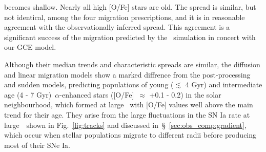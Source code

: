 \documentclass[draft2.tex]{subfiles}
\begin{document}
becomes shallow. 
Nearly all high [O/Fe] stars are old. 
The spread is similar, but not identical, among the four migration 
prescriptions, and it is in reasonable agreement with the observationally 
inferred spread. 
This agreement is a significant success of the migration predicted by the
\hsim~simulation in concert with our GCE model. 
\par 
Although their median trends and characteristic spreads are similar, the 
diffusion and linear migration models show a marked diffrence from the 
post-processing and sudden models, predicting populations of young 
($\lesssim$ 4 Gyr) and intermediate age (4 - 7 Gyr)~$\alpha$-enhanced stars 
([O/Fe]~$\approx$ +0.1 - 0.2) in the solar neighbourhood, which formed at large 
\rgal~with [O/Fe] values well above the main trend for their age. 
They arise from the large fluctuations in the SN Ia rate at large~\rgal~shown 
in Fig.~\ref{fig:tracks} and discussed in~\S~\ref{sec:obs_comp:gradient}, 
which occur when stellar populations migrate to different radii before 
producing most of their SNe Ia. 
\end{document}
